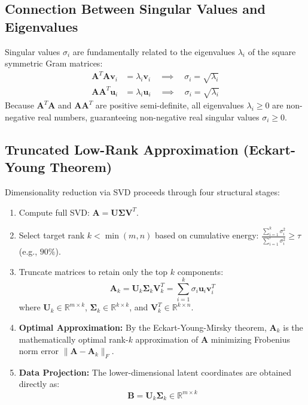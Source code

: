 \subsection{Connection Between Singular Values and Eigenvalues}
Singular values $\sigma_i$ are fundamentally related to the eigenvalues $\lambda_i$ of the square symmetric Gram matrices:
\begin{align}
    \mathbf{A}^T \mathbf{A} \mathbf{v}_i &= \lambda_i \mathbf{v}_i \quad \implies \quad \sigma_i = \sqrt{\lambda_i} \\
    \mathbf{A} \mathbf{A}^T \mathbf{u}_i &= \lambda_i \mathbf{u}_i \quad \implies \quad \sigma_i = \sqrt{\lambda_i}
\end{align}
Because $\mathbf{A}^T \mathbf{A}$ and $\mathbf{A} \mathbf{A}^T$ are positive semi-definite, all eigenvalues $\lambda_i \ge 0$ are non-negative real numbers, guaranteeing non-negative real singular values $\sigma_i \ge 0$.

\subsection{Truncated Low-Rank Approximation (Eckart-Young Theorem)}
Dimensionality reduction via SVD proceeds through four structural stages:
\begin{enumerate}
    \item Compute full SVD: $\mathbf{A} = \mathbf{U} \boldsymbol{\Sigma} \mathbf{V}^T$.
    \item Select target rank $k < \min(m, n)$ based on cumulative energy: $\frac{\sum_{i=1}^k \sigma_i^2}{\sum_{i=1}^r \sigma_i^2} \ge \tau$ (e.g., $90\%$).
    \item Truncate matrices to retain only the top $k$ components:
    \begin{equation}
        \mathbf{A}_k = \mathbf{U}_k \boldsymbol{\Sigma}_k \mathbf{V}_k^T = \sum_{i=1}^k \sigma_i \mathbf{u}_i \mathbf{v}_i^T
    \end{equation}
    where $\mathbf{U}_k \in \mathbb{R}^{m \times k}$, $\boldsymbol{\Sigma}_k \in \mathbb{R}^{k \times k}$, and $\mathbf{V}_k^T \in \mathbb{R}^{k \times n}$.
    \item \textbf{Optimal Approximation:} By the Eckart-Young-Mirsky theorem, $\mathbf{A}_k$ is the mathematically optimal rank-$k$ approximation of $\mathbf{A}$ minimizing Frobenius norm error $\|\mathbf{A} - \mathbf{A}_k\|_F$.
    \item \textbf{Data Projection:} The lower-dimensional latent coordinates are obtained directly as:
    \begin{equation}
        \mathbf{B} = \mathbf{U}_k \boldsymbol{\Sigma}_k \in \mathbb{R}^{m \times k}
    \end{equation}
\end{enumerate}


